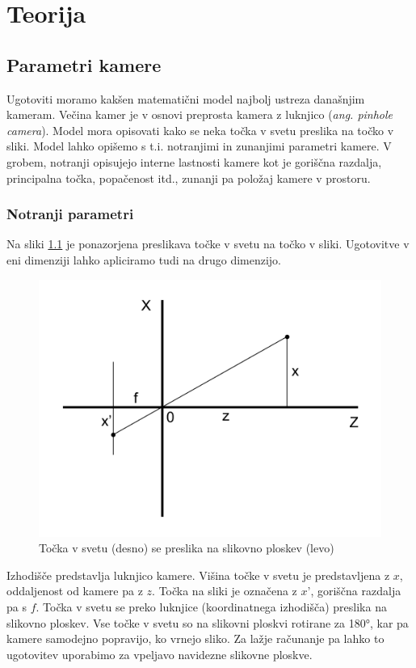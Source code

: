 \documentclass[a4paper, 12pt]{book}
\begin{document}
\chapter{Teorija}
\section{Parametri kamere}\label{parametri}
Ugotoviti moramo kakšen matematični model najbolj ustreza današnjim kameram. Večina kamer je v osnovi preprosta kamera z luknjico (\emph{ang. pinhole camera}). Model mora opisovati kako se neka točka v svetu preslika na točko v sliki. Model lahko opišemo s t.i. notranjimi in zunanjimi parametri kamere. V grobem, notranji opisujejo interne lastnosti kamere kot je goriščna razdalja, principalna točka, popačenost itd., zunanji pa položaj kamere v prostoru.

\subsection{Notranji parametri}
Na sliki \ref{similar1} je ponazorjena preslikava točke v svetu na točko v sliki. Ugotovitve v eni dimenziji lahko apliciramo tudi na drugo dimenzijo. 

\begin{figure}[H]
\centering
\includegraphics[width=\textwidth,height=\textheight,keepaspectratio]{similar_triangles_1.png}
\caption{Točka v svetu (desno) se preslika na slikovno ploskev (levo)}
\label{similar1}
\end{figure}

Izhodišče predstavlja luknjico kamere. Višina točke v svetu je predstavljena z $x$, oddaljenost od kamere pa z $z$. Točka na sliki je označena z $x’$, goriščna razdalja pa s $f$. Točka v svetu se preko luknjice (koordinatnega izhodišča) preslika na slikovno ploskev. Vse točke v svetu so na slikovni ploskvi rotirane za 180°, kar pa kamere samodejno popravijo, ko vrnejo sliko. Za lažje računanje pa lahko to ugotovitev uporabimo za vpeljavo navidezne slikovne ploskve. 
\end{document}
